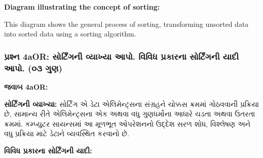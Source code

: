\textbf{Diagram illustrating the concept of sorting:}

\begin{Shaded}
\begin{Highlighting}[]
\end{Highlighting}
\end{Shaded}

This diagram shows the general process of sorting, transforming unsorted
data into sorted data using a sorting algorithm.

\hypertarget{uxaaauxab0uxab6uxaa8-4aor-uxab8uxab0uxa9fuxa97uxaa8-uxab5uxaafuxa96uxaaf-uxa86uxaaa.-uxab5uxab5uxaa7-uxaaauxab0uxa95uxab0uxaa8-uxab8uxab0uxa9fuxa97uxaa8-uxaafuxaa6-uxa86uxaaa.-uxae6uxae9-uxa97uxaa3}{%
\subsubsection{પ્રશ્ન 4aOR: સોર્ટિંગની વ્યાખ્યા આપો. વિવિધ પ્રકારના સોર્ટિંગની
યાદી આપો. (૦૩
ગુણ)}\label{uxaaauxab0uxab6uxaa8-4aor-uxab8uxab0uxa9fuxa97uxaa8-uxab5uxaafuxa96uxaaf-uxa86uxaaa.-uxab5uxab5uxaa7-uxaaauxab0uxa95uxab0uxaa8-uxab8uxab0uxa9fuxa97uxaa8-uxaafuxaa6-uxa86uxaaa.-uxae6uxae9-uxa97uxaa3}}

\textbf{જવાબ 4aOR:}

\textbf{સોર્ટિંગની વ્યાખ્યા:} સોર્ટિંગ એ ડેટા એલિમેન્ટ્સના સંગ્રહને ચોક્કસ ક્રમમાં
ગોઠવવાની પ્રક્રિયા છે, સામાન્ય રીતે એલિમેન્ટ્સના એક અથવા વધુ ગુણધર્મોના આધારે ચડતા
અથવા ઉતરતા ક્રમમાં. કમ્પ્યુટર સાયન્સમાં આ મૂળભૂત ઓપરેશનનો ઉદ્દેશ સરળ શોધ, વિશ્લેષણ અને
વધુ પ્રક્રિયા માટે ડેટાને વ્યવસ્થિત કરવાનો છે.

\textbf{વિવિધ પ્રકારના સોર્ટિંગની યાદી:}

